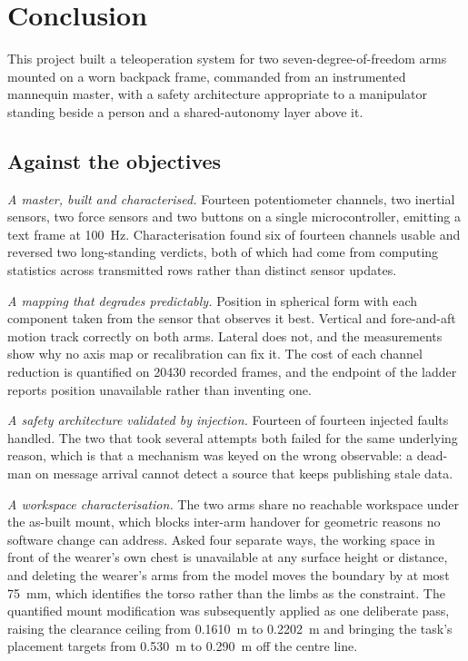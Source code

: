 \chapter{Conclusion}
\label{ch:conclusion}

This project built a teleoperation system for two seven-degree-of-freedom arms
mounted on a worn backpack frame, commanded from an instrumented mannequin
master, with a safety architecture appropriate to a manipulator standing
beside a person and a shared-autonomy layer above it.

\section{Against the objectives}

\emph{A master, built and characterised.} Fourteen potentiometer channels, two
inertial sensors, two force sensors and two buttons on a single
microcontroller, emitting a text frame at \SI{100}{\hertz}. Characterisation
found six of fourteen channels usable and reversed two long-standing verdicts,
both of which had come from computing statistics across transmitted rows
rather than distinct sensor updates.

\emph{A mapping that degrades predictably.} Position in spherical form with
each component taken from the sensor that observes it best. Vertical and
fore-and-aft motion track correctly on both arms. Lateral does not, and the
measurements show why no axis map or recalibration can fix it. The cost of
each channel reduction is quantified on \num{20430} recorded frames, and the
endpoint of the ladder reports position unavailable rather than inventing one.

\emph{A safety architecture validated by injection.} Fourteen of fourteen
injected faults handled. The two that took several attempts both failed for
the same underlying reason, which is that a mechanism was keyed on the wrong
observable: a dead-man on message arrival cannot detect a source that keeps
publishing stale data.

\emph{A workspace characterisation.} The two arms share no reachable
workspace under the as-built mount, which blocks inter-arm handover for
geometric reasons no software change can address. Asked four separate ways,
the working space in front of the wearer's own chest is unavailable at any
surface height or distance, and deleting the wearer's arms from the model
moves the boundary by at most \SI{75}{\milli\metre}, which identifies the
torso rather than the limbs as the constraint. The quantified mount
modification was subsequently applied as one deliberate pass, raising the
clearance ceiling from \SI{0.1610}{\metre} to \SI{0.2202}{\metre} and bringing
the task's placement targets from \SI{0.530}{\metre} to \SI{0.290}{\metre} off
the centre line.

